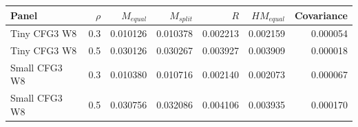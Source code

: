 {\small\setlength{\tabcolsep}{3pt}
\begin{tabular}{lrrrrrr}
\hline
Panel & $\rho$ & $M_{equal}$ & $M_{split}$ & $R$ & $H M_{equal}$ & Covariance \\
\hline
Tiny CFG3 W8 & 0.3 & 0.010126 & 0.010378 & 0.002213 & 0.002159 & 0.000054 \\
Tiny CFG3 W8 & 0.5 & 0.030126 & 0.030267 & 0.003927 & 0.003909 & 0.000018 \\
Small CFG3 W8 & 0.3 & 0.010380 & 0.010716 & 0.002140 & 0.002073 & 0.000067 \\
Small CFG3 W8 & 0.5 & 0.030756 & 0.032086 & 0.004106 & 0.003935 & 0.000170 \\
\hline
\end{tabular}
}
